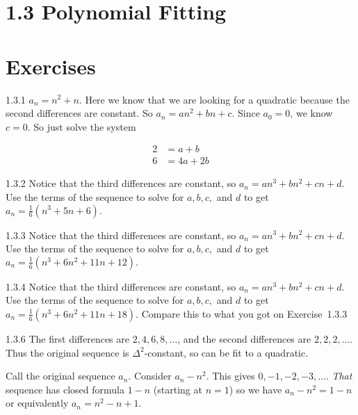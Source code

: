 \documentclass[11pt,]{book}
\theoremstyle{ptxplainnotitle}
\theoremstyle{ptxplaintitle}
\theoremstyle{ptxdefinitionnotitle}
\theoremstyle{ptxdefinitiontitle}
\theoremstyle{ptxdefinitionnotitle}
\theoremstyle{ptxdefinitiontitle}
\theoremstyle{ptxdefinitionnotitle}
\theoremstyle{ptxdefinitiontitle}
\theoremstyle{ptxdefinitiontitlenonumber}
\theoremstyle{ptxdefinitiontitlenonumber}
\numberwithin{equation}{chapter}
\newcommand{\amp}{&}
\begin{document}
\section*{1.3 Polynomial Fitting}
\section*{Exercises}
\begin{divisionexercise}{1.3.1}
\textbf{}\hypertarget{p-372}{}%
\(a_n = n^2 + n\text{.}\)  Here we know that we are looking for a quadratic because the second differences are constant.  So \(a_n = an^2 + bn + c\text{.}\)  Since \(a_0 = 0\text{,}\) we know \(c= 0\text{.}\)  So just solve the system%
\par
\hypertarget{p-373}{}%
%
\begin{equation*}
\begin{aligned}
2 \amp = a + b \\
6 \amp = 4a + 2b 
\end{aligned}
\end{equation*}
%
\end{divisionexercise}%
\begin{divisionexercise}{1.3.2}
\textbf{}\hypertarget{p-378}{}%
Notice that the third differences are constant, so \(a_n = an^3 + bn^2 + cn + d\text{.}\) Use the terms of the sequence to solve for \(a, b, c,\) and \(d\) to get \(a_n = \frac{1}{6} (n^3 + 5n + 6)\text{.}\)%
\end{divisionexercise}%
\begin{divisionexercise}{1.3.3}
\textbf{}\hypertarget{p-383}{}%
Notice that the third differences are constant, so \(a_n = an^3 + bn^2 + cn + d\text{.}\) Use the terms of the sequence to solve for \(a, b, c,\) and \(d\) to get \(a_n = \frac{1}{6} (n^3 + 6n^2 + 11n + 12)\text{.}\)%
\end{divisionexercise}%
\begin{divisionexercise}{1.3.4}
\textbf{}\hypertarget{p-388}{}%
Notice that the third differences are constant, so \(a_n = an^3 + bn^2 + cn + d\text{.}\) Use the terms of the sequence to solve for \(a, b, c,\) and \(d\) to get \(a_n = \frac{1}{6} (n^3 + 6n^2 + 11n + 18)\text{.}\)  Compare this to what you got on Exercise~1.3.3%
\end{divisionexercise}%
\begin{divisionexercise}{1.3.6}
\textbf{}\hypertarget{p-391}{}%
The first differences are \(2, 4, 6, 8, \ldots\), and the second differences are \(2, 2, 2, \ldots\). Thus the original sequence is \(\Delta^2\)-constant, so can be fit to a quadratic.%
\par
\hypertarget{p-392}{}%
Call the original sequence \(a_n\). Consider \(a_n - n^2\). This gives \(0, -1, -2, -3, \ldots\). \emph{That} sequence has closed formula \(1-n\) (starting at \(n = 1\)) so we have \(a_n - n^2 = 1-n\) or equivalently \(a_n = n^2 - n + 1\).%
\end{divisionexercise}%
\end{document}

